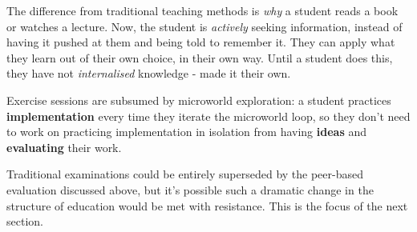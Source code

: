 The difference from traditional teaching methods is \emph{why} a student
reads a book or watches a lecture. Now, the student is \emph{actively}
seeking information, instead of having it pushed at them and being told
to remember it. They can apply what they learn out of their own choice,
in their own way. Until a student does this, they have not
\emph{internalised} knowledge - made it their own.

Exercise sessions are subsumed by microworld exploration: a student
practices \textbf{implementation} every time they iterate the microworld
loop, so they don't need to work on practicing implementation in
isolation from having \textbf{ideas} and \textbf{evaluating} their work.

Traditional examinations could be entirely superseded by the peer-based
evaluation discussed above, but it's possible such a dramatic change in
the structure of education would be met with resistance. This is the
focus of the next section.

